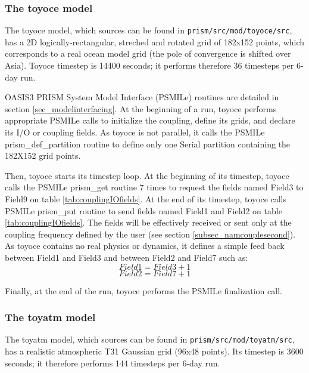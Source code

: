 \subsubsection{The toyoce model}
\label{sec:toyoce}

The toyoce model, which sources can be found in
{\tt prism/src/mod/toyoce/src}, has a 2D logically-rectangular, streched
and rotated grid of 182x152 points, which corresponds to a real ocean
model grid (the pole of convergence is shifted over Asia). Toyoce timestep is
14400 seconds; it performs therefore 36 timesteps per 6-day run.

OASIS3 PRISM System Model Interface (PSMILe) routines are detailed in
section \ref{sec_modelinterfacing}. At the beginning of a run, toyoce
performs appropriate PSMILe calls to initialize the coupling, define
its grids, and declare its I/O or coupling fields. As toyoce is not
parallel, it calls the PSMILe prism\_def\_partition routine to
define only one Serial partition containing the 182X152 grid points.

Then, toyoce starts its timestep loop. At the beginning of its timestep,
toyoce calls the PSMILe prism\_get routine 7 times to request the
fields named Field3 to Field9 on table \ref{tab:couplingIOfields}. At
the end of its timestep, toyoce calls PSMILe prism\_put routine to send
fields named Field1 and Field2 on table
\ref{tab:couplingIOfields}. The fields will be effectively received or
sent only at the coupling frequency defined by the user (see section
\ref{subsec_namcouplesecond}). As toyoce contains no real physics or dynamics,
it defines a simple feed back between Field1 and Field3 and between
Field2 and Field7 such as:
$$ Field1 = Field3 + 1 $$
$$ Field2 = Field7 + 1 $$

Finally, at the end of the run, toyoce performs the PSMILe finalization call. 

\subsubsection{The toyatm model}
\label{sec:toyatm} 

The toyatm model, which sources can be found in
{\tt prism/src/mod/toyatm/src}, has a realistic atmospheric T31 Gaussian
grid (96x48 points). Its timestep is 3600 seconds; it therefore performs 144
timesteps per 6-day run.


